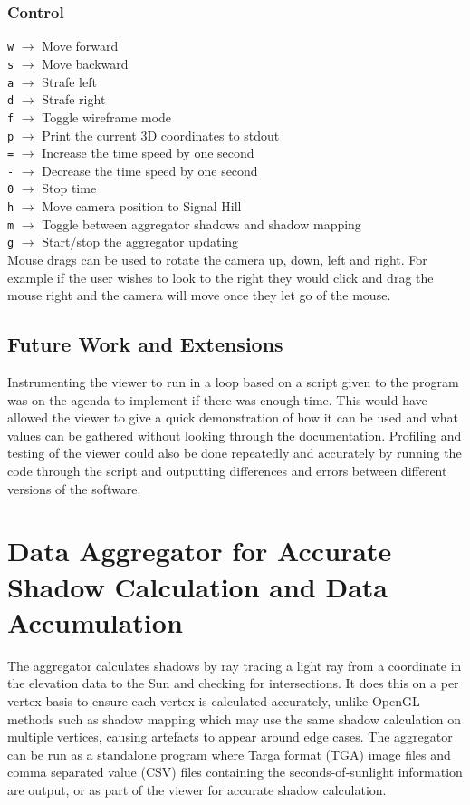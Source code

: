 \documentclass[12pt]{report}
\begin{document}
\subsection{Control}

\texttt{w} $\rightarrow$ Move forward\\
\texttt{s} $\rightarrow$ Move backward\\
\texttt{a} $\rightarrow$ Strafe left\\
\texttt{d} $\rightarrow$ Strafe right\\
\texttt{f} $\rightarrow$ Toggle wireframe mode\\
\texttt{p} $\rightarrow$ Print the current 3D coordinates to stdout\\
\texttt{=} $\rightarrow$ Increase the time speed by one second\\
\texttt{-} $\rightarrow$ Decrease the time speed by one second\\
\texttt{0} $\rightarrow$ Stop time\\
\texttt{h} $\rightarrow$ Move camera position to Signal Hill\\
\texttt{m} $\rightarrow$ Toggle between aggregator shadows and shadow mapping\\
\texttt{g} $\rightarrow$ Start/stop the aggregator updating\\

Mouse drags can be used to rotate the camera up, down, left and right. For example if the user wishes to look to the right they would click and drag the mouse right and the camera will move once they let go of the mouse.

\section{Future Work and Extensions}
Instrumenting the viewer to run in a loop based on a script given to the program was on the agenda to implement if there was enough time. This would have allowed the viewer to give a quick demonstration of how it can be used and what values can be gathered without looking through the documentation. Profiling and testing of the viewer could also be done repeatedly and accurately by running the code through the script and outputting differences and errors between different versions of the software.

\chapter{Data Aggregator for Accurate Shadow Calculation and Data Accumulation}
The aggregator calculates shadows by ray tracing a light ray from a coordinate in the elevation data to the Sun and checking for intersections. It does this on a per vertex basis to ensure each vertex is calculated accurately, unlike OpenGL methods such as shadow mapping which may use the same shadow calculation on multiple vertices, causing artefacts to appear around edge cases. The aggregator can be run as a standalone program where Targa format (TGA) image files and comma separated value (CSV) files containing the seconds-of-sunlight information are output, or as part of the viewer for accurate shadow calculation.
\end{document}
